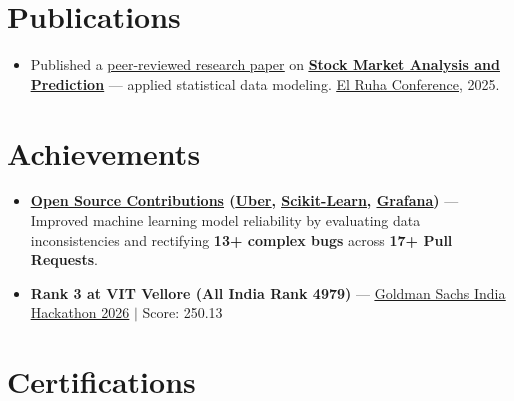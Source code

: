 \documentclass[a4paper,10pt]{article}
\newcommand{\ulink}[2]{\href{#1}{\uline{#2}}}
\begin{document}
\vspace{1pt}

\section{Publications}
\vspace{1pt}
\begin{itemize}[nosep, leftmargin=1.5em, itemsep=1pt, topsep=2pt]
  \item {\color[HTML]{0A0A0A}\fontsize{11}{14}\selectfont
  Published a \ulink{https://www.elruha.org/_files/ugd/614b1f_6b95e1b697bf452b9907ba46e0151c05.pdf\#page=774}{peer-reviewed research paper} on \ulink{https://github.com/su-jin1425/Set-Project}{\textbf{Stock Market Analysis and Prediction}} --- applied statistical data modeling. \ulink{https://www.elruha.org/congress-books}{El Ruha Conference}, 2025.}
\end{itemize}

\vspace{1pt}

\section{Achievements}
\vspace{1pt}
\begin{itemize}[nosep, leftmargin=1.5em, itemsep=1pt, topsep=2pt]
  \item {\color[HTML]{0A0A0A}\fontsize{11}{14}\selectfont \textbf{\ulink{https://github.com/su-jin1425/My-Open-Source-Contributions}{Open Source Contributions} (\ulink{https://github.com/uber/causalml}{Uber}, \ulink{https://github.com/scikit-learn-contrib/forest-confidence-interval}{Scikit-Learn}, \ulink{https://github.com/grafana/alloy-scenarios}{Grafana})} --- Improved machine learning model reliability by evaluating data inconsistencies and rectifying \textbf{13+ complex bugs} across \textbf{17+ Pull Requests}.}
  \item {\color[HTML]{0A0A0A}\fontsize{11}{14}\selectfont \textbf{Rank 3 at VIT Vellore (All India Rank 4979)} --- \ulink{https://www.hackerrank.com/contests/goldman-sachs-india-hackathon-2026-cs/leaderboard}{Goldman Sachs India Hackathon 2026} $|$ Score: 250.13}
\end{itemize}

\vspace{1pt}

\section{Certifications}
\vspace{1pt}
\end{document}

